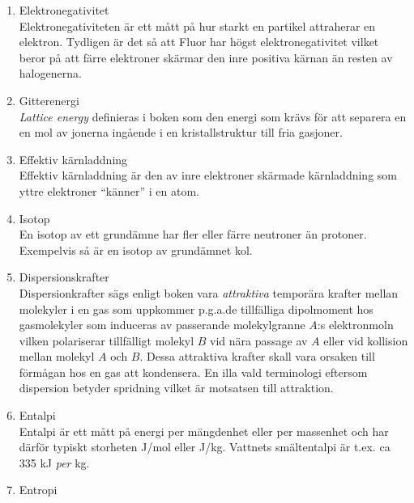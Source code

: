 \documentclass[./chem_exercises.tex]{subfiles}
\begin{document}
\begin{enumerate}
\item Elektronegativitet \\

Elektronegativiteten är ett mått på hur starkt en partikel attraherar en elektron. Tydligen är det så att Fluor har högst elektronegativitet
vilket beror på att färre elektroner skärmar den inre positiva kärnan än resten av halogenerna.

\item Gitterenergi \\

\textit{Lattice energy} definieras i boken som den energi som krävs för att separera en en mol av jonerna ingående i en kristallstruktur till fria gasjoner.\\

\item Effektiv kärnladdning\\

Effektiv kärnladdning är den av inre elektroner skärmade kärnladdning som yttre elektroner ``känner'' i en atom.

\item Isotop \\

En isotop av ett grundämne har fler eller färre neutroner än protoner. Exempelvis så är  en isotop av grundämnet kol.

\item Dispersionskrafter \\

Dispersionkrafter sägs enligt boken vara \textit{attraktiva} temporära krafter mellan molekyler i en gas som uppkommer p.g.a.de tillfälliga dipolmoment
hos gasmolekyler som induceras av passerande molekylgranne $A$:s elektronmoln vilken polariserar tillfälligt molekyl $B$ vid nära passage  av $A$ eller vid kollision mellan molekyl $A$
och $B$.
Dessa attraktiva krafter skall vara orsaken till förmågan hos en gas att kondensera.
En illa vald terminologi eftersom dispersion betyder spridning vilket är motsatsen till attraktion.

\item Entalpi\\

Entalpi är ett mått på energi per mängdenhet eller per massenhet och har därför typiskt storheten J/mol eller J/kg.
Vattnets smältentalpi är t.ex. ca 335 kJ \textit {per} kg.

\item Entropi \\


\end{enumerate}
\end{document}
